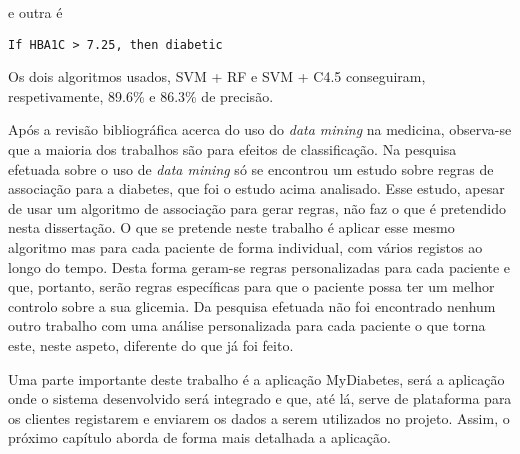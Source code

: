 e outra é

\begin{lstlisting}
If HBA1C > 7.25, then diabetic
\end{lstlisting}
Os dois algoritmos usados, SVM + RF e SVM + C4.5 conseguiram, respetivamente, 89.6\% e 86.3\% de precisão.

Após a revisão bibliográfica acerca do uso do \textit{data mining} na medicina, observa-se que a maioria dos trabalhos são para efeitos de classificação. Na pesquisa efetuada sobre o uso de \textit{data mining} só se encontrou um estudo sobre regras de associação para a diabetes, que foi o estudo acima analisado. Esse estudo, apesar de usar um algoritmo de associação para gerar regras, não faz o que é pretendido nesta dissertação. 
O que se pretende neste trabalho é aplicar esse mesmo algoritmo mas para cada paciente de forma individual, com vários registos ao longo do tempo. Desta forma geram-se regras personalizadas para cada paciente e que, portanto, serão regras específicas para que o paciente possa ter um melhor controlo sobre a sua glicemia. Da pesquisa efetuada não foi encontrado nenhum outro trabalho com uma análise personalizada para cada paciente o que torna este, neste aspeto, diferente do que já foi feito.

Uma parte importante deste trabalho é a aplicação MyDiabetes, será a aplicação onde o sistema desenvolvido será integrado e que, até lá, serve de plataforma para os clientes registarem e enviarem os dados a serem utilizados no projeto. Assim, o próximo capítulo aborda de forma mais detalhada a aplicação.









